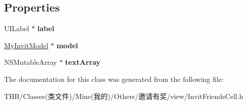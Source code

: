 \subsection*{Properties}
\begin{DoxyCompactItemize}
\item 
\mbox{\label{interface_invit_friends_cell_a84d57f827742717c7311b2a9cd275eb5}} 
U\+I\+Label $\ast$ {\bfseries label}
\item 
\mbox{\label{interface_invit_friends_cell_ac64b96ddc9e9963552acc8f0bd3535ed}} 
\mbox{\hyperlink{interface_my_invit_model}{My\+Invit\+Model}} $\ast$ {\bfseries model}
\item 
\mbox{\label{interface_invit_friends_cell_aea1dcf15b1ed4202dcc2901842122db6}} 
N\+S\+Mutable\+Array $\ast$ {\bfseries text\+Array}
\end{DoxyCompactItemize}


The documentation for this class was generated from the following file\+:\begin{DoxyCompactItemize}
\item 
T\+H\+B/\+Classes(类文件)/\+Mine(我的)/\+Others/邀请有奖/view/Invit\+Friends\+Cell.\+h\end{DoxyCompactItemize}
